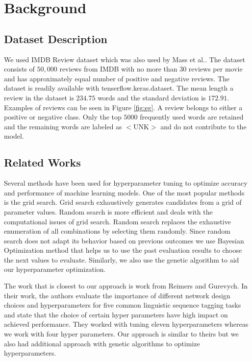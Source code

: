 \documentclass[conference]{IEEEtran}
\begin{document}
\section{Background}
\subsection{Dataset Description}
We used IMDB Review dataset which was also used by Mass et al.\cite{imdb}. The dataset consists of $50,000$ reviews from IMDB with no more than $30$ reviews per movie and has approximately equal number of positive and negative reviews. The dataset is readily available with tenserflow.keras.dataset. The mean length a review in the dataset is $234.75$ words and the standard deviation is $172.91$. Examples of reviews can be seen in Figure \ref{fig:eg}. A review belongs to either a positive or negative class. Only the top $5000$ frequently used words are retained and the remaining words are labeled as $<$UNK$>$ and do not contribute to the model.

\subsection{Related Works}
Several methods have been used for hyperparameter tuning to optimize accuracy and performance\cite{methods} of machine learning models. One of the most popular methods is the grid search. Grid search exhaustively generates candidates from a grid of parameter values. Random search \cite {random,odyssey} is more efficient and deals with the computational issues of grid search. Random search replaces the exhaustive enumeration of all combinations by selecting them randomly. Since random search does not adapt its behavior based on previous outcomes we use Bayesian Optimization\cite{bayesian} method that helps us to use the past evaluation results to choose the next values to evaluate. Similarly, we also use the genetic algorithm to aid our hyperparameter optimization.

The work that is closest to our approach is work from Reimers and Gurevych\cite{optimal}. In their work, the authors evaluate the importance of different network design choices and hyperparameters for five common linguistic sequence tagging tasks and state that the choice of certain hyper parameters have high impact on achieved performance. They worked with tuning eleven hyperparameters whereas we work with four hyper parameters. Our approach is similar to theirs but we also had additional approach with genetic algorithms to optimize hyperparameters.
\end{document}
